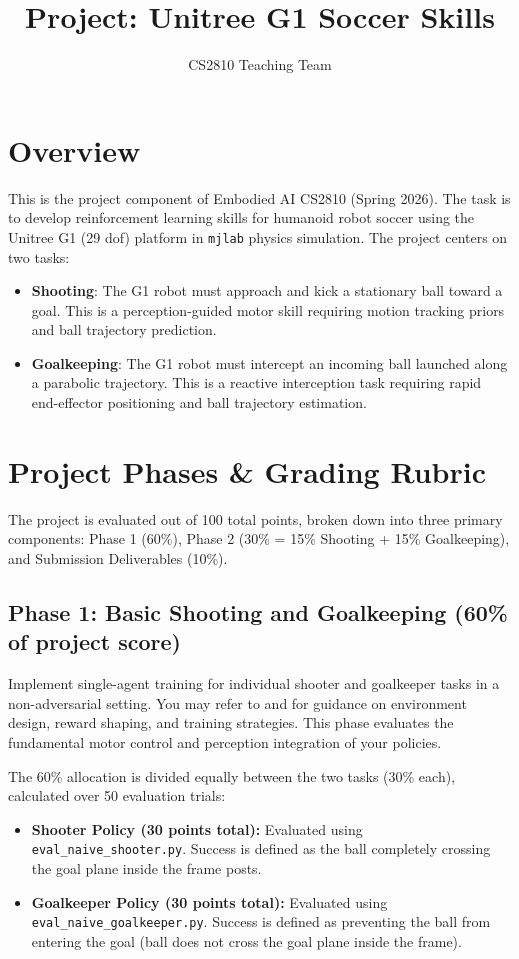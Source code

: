 \documentclass{article}
\title{Project: Unitree G1 Soccer Skills}
\author{CS2810 Teaching Team}
\begin{document}
\maketitle

\section{Overview}

This is the project component of Embodied AI CS2810 (Spring 2026). The task is to develop reinforcement learning skills for humanoid robot soccer using the Unitree G1 (29 dof) platform in \texttt{mjlab} physics simulation. The project centers on two tasks:

\begin{itemize}
  \item \textbf{Shooting}: The G1 robot must approach and kick a stationary ball toward a goal. This is a perception-guided motor skill requiring motion tracking priors and ball trajectory prediction.
  \item \textbf{Goalkeeping}: The G1 robot must intercept an incoming ball launched along a parabolic trajectory. This is a reactive interception task requiring rapid end-effector positioning and ball trajectory estimation.
\end{itemize}

\section{Project Phases \& Grading Rubric}
The project is evaluated out of 100 total points, broken down into three primary components: Phase 1 (60\%), Phase 2 (30\% = 15\% Shooting + 15\% Goalkeeping), and Submission Deliverables (10\%).

\subsection{Phase 1: Basic Shooting and Goalkeeping (60\% of project score)}
Implement single-agent training for individual shooter and goalkeeper tasks in a non-adversarial setting. You may refer to \cite{kong2026learningsoccerskillshumanoid} and \cite{ren2025humanoidgoalkeeper} for guidance on environment design, reward shaping, and training strategies. This phase evaluates the fundamental motor control and perception integration of your policies.

The 60\% allocation is divided equally between the two tasks (30\% each), calculated over 50 evaluation trials:
\begin{itemize}
    \item \textbf{Shooter Policy (30 points total):} Evaluated using \texttt{eval\_naive\_shooter.py}. Success is defined as the ball completely crossing the goal plane inside the frame posts.
    \item \textbf{Goalkeeper Policy (30 points total):} Evaluated using \texttt{eval\_naive\_goalkeeper.py}. Success is defined as preventing the ball from entering the goal (ball does not cross the goal plane inside the frame).
\end{itemize}
\end{document}
